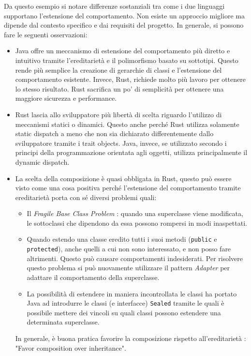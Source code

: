 Da questo esempio si notare differenze sostanziali tra come i due linguaggi supportano l'estensione del comportamento. Non esiste un approccio migliore ma dipende dal contesto specifico e dai requisiti del progetto. In generale, si possono fare le seguenti osservazioni:
\begin{itemize}
    \item Java offre un meccanismo di estensione del comportamento più diretto e intuitivo tramite l'ereditarietà e il polimorfismo basato su sottotipi. Questo rende più semplice la creazione di gerarchie di classi e l'estensione del comportamento esistente. Invece, Rust, richiede molto più lavoro per ottenere lo stesso risultato. Rust sacrifica un po' di semplicità per ottenere una maggiore sicurezza e performance.
    \item Rust lascia allo sviluppatore più libertà di scelta riguardo l'utilizzo di meccanismi statici o dinamici. Questo anche perché Rust utilizza solamente static dispatch a meno che non sia dichiarato differentemente dallo sviluppatore tramite i trait objects. Java, invece, se utilizzato secondo i principi della programmazione orientata agli oggetti, utilizza principalmente il dynamic dispatch.
    \item La scelta della composizione è quasi obbligata in Rust, questo può essere visto come una cosa positiva perché l'estensione del comportamento tramite ereditarietà porta con sé diversi problemi quali:
    \begin{itemize}
        \item Il \textit{Fragile Base Class Problem} \cite{mikhajlov-sekerinski-fragile-base-class}: quando una superclasse viene modificata, le sottoclassi che dipendono da essa possono rompersi in modi inaspettati.
        \item Quando estendo una classe eredito tutti i suoi metodi (\texttt{public} e \texttt{protected}), anche quelli a cui non sono interessato, e non posso fare altrimenti. Questo può causare comportamenti indesiderati. Per risolvere questo problema si può nuovamente utilizzare il pattern \textit{Adapter} per adattare il comportamento della superclasse.
        \item La possibilità di estendere in maniera incontrollata le classi ha portato Java ad introdurre le classi (e interfacce) \texttt{Sealed} tramite le quali è possibile mettere dei vincoli su quali classi possono estendere una determinata superclasse.
    \end{itemize}
    In generale, è buona pratica favorire la composizione rispetto all'ereditarietà \cite{gamma-design-patterns}: "Favor composition over inheritance".
\end{itemize}
